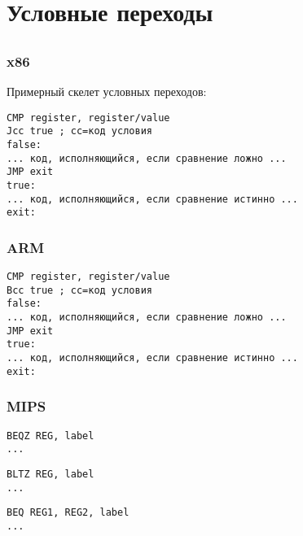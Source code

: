 \chapter{Условные переходы}
\label{sec:Jcc}






\section{\Conclusion{}}

\subsection{x86}

Примерный скелет условных переходов:

\begin{lstlisting}[caption=x86]
CMP register, register/value
Jcc true ; cc=код условия
false:
... код, исполняющийся, если сравнение ложно ...
JMP exit 
true:
... код, исполняющийся, если сравнение истинно ...
exit:
\end{lstlisting}

\subsection{ARM}

\begin{lstlisting}[caption=ARM]
CMP register, register/value
Bcc true ; cc=код условия
false:
... код, исполняющийся, если сравнение ложно ...
JMP exit 
true:
... код, исполняющийся, если сравнение истинно ...
exit:
\end{lstlisting}

\subsection{MIPS}

\begin{lstlisting}[caption=Проверка на ноль]
BEQZ REG, label
...
\end{lstlisting}

\begin{lstlisting}[caption=Меньше ли нуля?]
BLTZ REG, label
...
\end{lstlisting}

\begin{lstlisting}[caption=Проверка на равенство]
BEQ REG1, REG2, label
...
\end{lstlisting}

